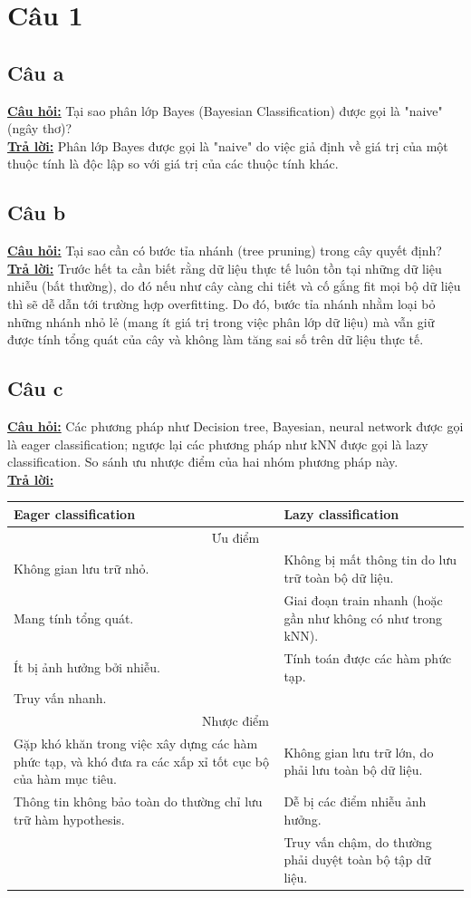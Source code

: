 \documentclass[a4paper 14pt]{extarticle}
\begin{document}
	
	\pagebreak
	
	\section{Câu 1}
		\subsection{Câu a}
			\underline{\textbf{Câu hỏi:}} Tại sao phân lớp Bayes (Bayesian Classification) được gọi là "naive" (ngây thơ)?\\
			\underline{\textbf{Trả lời:}} Phân lớp Bayes được gọi là "naive" do việc giả định về giá trị của một thuộc tính là độc lập so với giá trị của các thuộc tính khác.
		\subsection{Câu b}
			\underline{\textbf{Câu hỏi:}} Tại sao cần có bước tỉa nhánh (tree pruning) trong cây quyết định?\\
			\underline{\textbf{Trả lời:}} Trước hết ta cần biết rằng dữ liệu thực tế luôn tồn tại những dữ liệu nhiễu (bất thường), do đó nếu như cây càng chi tiết và cố gắng fit mọi bộ dữ liệu thì sẽ dễ dẫn tới trường hợp overfitting. Do đó, bước tỉa nhánh nhằm loại bỏ những nhánh nhỏ lẻ (mang ít giá trị trong việc phân lớp dữ liệu) mà vẫn giữ được tính tổng quát của cây và không làm tăng sai số trên dữ liệu thực tế.
		\subsection{Câu c}
			\underline{\textbf{Câu hỏi:}} Các phương pháp như Decision tree, Bayesian, neural network được gọi là eager classification; ngược lại các phương pháp như kNN được gọi là lazy classification. So sánh ưu nhược điểm của hai nhóm phương pháp này.\\
			\underline{\textbf{Trả lời:}} \\
			\begin{tabular}{p{3in} | p{3in}}
				Eager classification & Lazy classification\\
				\hline
				\multicolumn{2}{c}{Ưu điểm}\\
				Không gian lưu trữ nhỏ.&Không bị mất thông tin do lưu trữ toàn bộ dữ liệu.\\
				Mang tính tổng quát.&Giai đoạn train nhanh (hoặc gần như không có như trong kNN).\\
				Ít bị ảnh hưởng bởi nhiễu.&Tính toán được các hàm phức tạp.\\
				Truy vấn nhanh.&\\
				\hline
				\multicolumn{2}{c}{Nhược điểm}\\
				Gặp khó khăn trong việc xây dựng các hàm phức tạp, và khó đưa ra các xấp xỉ tốt cục bộ của hàm mục tiêu.&Không gian lưu trữ lớn, do phải lưu toàn bộ dữ liệu.\\
				Thông tin không bảo toàn do thường chỉ lưu trữ hàm hypothesis.&Dễ bị các điểm nhiễu ảnh hưởng.\\
				&Truy vấn chậm, do thường phải duyệt toàn bộ tập dữ liệu.\\
			\end{tabular}
\end{document}
